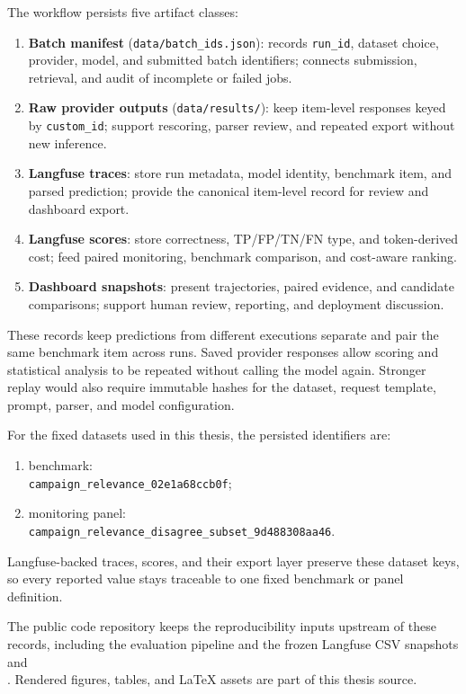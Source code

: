 The workflow persists five artifact classes:
\begin{enumerate}
    \item \textbf{Batch manifest} (\texttt{data/batch\_ids.json}):
    records \texttt{run\_id}, dataset choice, provider, model, and submitted batch identifiers;
    connects submission, retrieval, and audit of incomplete or failed jobs.
    \item \textbf{Raw provider outputs} (\texttt{data/results/}):
    keep item-level responses keyed by \texttt{custom\_id};
    support rescoring, parser review, and repeated export without new inference.
    \item \textbf{Langfuse traces}:
    store run metadata, model identity, benchmark item, and parsed prediction;
    provide the canonical item-level record for review and dashboard export.
    \item \textbf{Langfuse scores}:
    store correctness, TP/FP/TN/FN type, and token-derived cost;
    feed paired monitoring, benchmark comparison, and cost-aware ranking.
    \item \textbf{Dashboard snapshots}:
    present trajectories, paired evidence, and candidate comparisons;
    support human review, reporting, and deployment discussion.
\end{enumerate}

These records keep predictions from different executions separate and pair the same
benchmark item across runs.
Saved provider responses allow scoring and statistical analysis to be repeated without
calling the model again.
Stronger replay would also require immutable hashes for the dataset, request template,
prompt, parser, and model configuration.

For the fixed datasets used in this thesis, the persisted identifiers are:
\begin{enumerate}
    \item benchmark:\\
    \mbox{\texttt{campaign\_relevance\_02e1a68ccb0f}};
    \item monitoring panel:\\
    \mbox{\texttt{campaign\_relevance\_disagree\_subset\_9d488308aa46}}.
\end{enumerate}
Langfuse-backed traces, scores, and their export layer preserve these dataset keys,
so every reported value stays traceable to one fixed benchmark or panel definition.

The public code repository keeps the reproducibility inputs upstream of these records,
including the evaluation pipeline and the frozen Langfuse CSV snapshots\\
\mbox{}
and\\
\mbox{}.
Rendered figures, tables, and \LaTeX{} assets are part of this thesis source.


